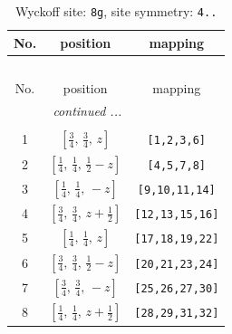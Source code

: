 \documentclass[fleqn,8pt]{jsarticle}
\begin{document}
\begin{longtable}{ccc}
\caption{Wyckoff site: {\tt 8g}, site symmetry: {\tt 4..}}
 \\
 \hline \hline
No. & position & mapping \\ \hline \endfirsthead

\multicolumn{2}{l}{\tablename\ \thetable{}} \\
 \hline \hline
No. & position & mapping \\ \hline \endhead

 \hline \hline
\multicolumn{2}{r}{\footnotesize\it continued ...} \\ \endfoot

 \hline \hline
\multicolumn{2}{r}{} \\ \endlastfoot

1 & $\left[ \frac{3}{4},\, \frac{3}{4},\, z \right]$ & {\tt [1,2,3,6]} \\ \hline
2 & $\left[ \frac{1}{4},\, \frac{1}{4},\, \frac{1}{2} - z \right]$ & {\tt [4,5,7,8]} \\ \hline
3 & $\left[ \frac{1}{4},\, \frac{1}{4},\, - z \right]$ & {\tt [9,10,11,14]} \\ \hline
4 & $\left[ \frac{3}{4},\, \frac{3}{4},\, z + \frac{1}{2} \right]$ & {\tt [12,13,15,16]} \\ \hline
5 & $\left[ \frac{1}{4},\, \frac{1}{4},\, z \right]$ & {\tt [17,18,19,22]} \\ \hline
6 & $\left[ \frac{3}{4},\, \frac{3}{4},\, \frac{1}{2} - z \right]$ & {\tt [20,21,23,24]} \\ \hline
7 & $\left[ \frac{3}{4},\, \frac{3}{4},\, - z \right]$ & {\tt [25,26,27,30]} \\ \hline
8 & $\left[ \frac{1}{4},\, \frac{1}{4},\, z + \frac{1}{2} \right]$ & {\tt [28,29,31,32]} \\
\end{longtable}
\renewcommand{\arraystretch}{1.2}
\end{document}
